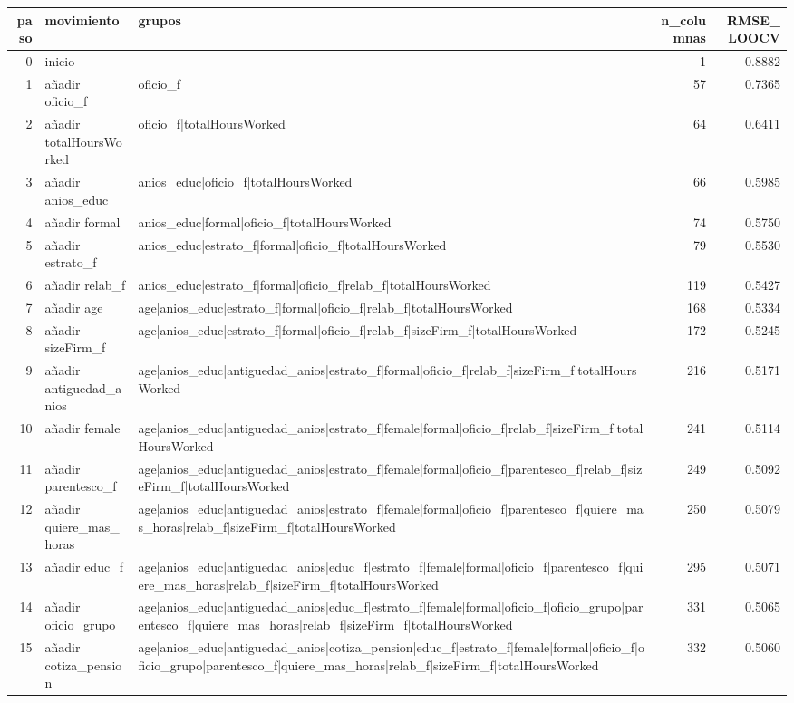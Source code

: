 \begin{tabular}{rllrr}
\toprule
paso & movimiento & grupos & n\_columnas & RMSE\_LOOCV \\
\midrule
0 & inicio &  & 1 & 0.8882 \\
1 & añadir oficio\_f & oficio\_f & 57 & 0.7365 \\
2 & añadir totalHoursWorked & oficio\_f|totalHoursWorked & 64 & 0.6411 \\
3 & añadir anios\_educ & anios\_educ|oficio\_f|totalHoursWorked & 66 & 0.5985 \\
4 & añadir formal & anios\_educ|formal|oficio\_f|totalHoursWorked & 74 & 0.5750 \\
5 & añadir estrato\_f & anios\_educ|estrato\_f|formal|oficio\_f|totalHoursWorked & 79 & 0.5530 \\
6 & añadir relab\_f & anios\_educ|estrato\_f|formal|oficio\_f|relab\_f|totalHoursWorked & 119 & 0.5427 \\
7 & añadir age & age|anios\_educ|estrato\_f|formal|oficio\_f|relab\_f|totalHoursWorked & 168 & 0.5334 \\
8 & añadir sizeFirm\_f & age|anios\_educ|estrato\_f|formal|oficio\_f|relab\_f|sizeFirm\_f|totalHoursWorked & 172 & 0.5245 \\
9 & añadir antiguedad\_anios & age|anios\_educ|antiguedad\_anios|estrato\_f|formal|oficio\_f|relab\_f|sizeFirm\_f|totalHoursWorked & 216 & 0.5171 \\
10 & añadir female & age|anios\_educ|antiguedad\_anios|estrato\_f|female|formal|oficio\_f|relab\_f|sizeFirm\_f|totalHoursWorked & 241 & 0.5114 \\
11 & añadir parentesco\_f & age|anios\_educ|antiguedad\_anios|estrato\_f|female|formal|oficio\_f|parentesco\_f|relab\_f|sizeFirm\_f|totalHoursWorked & 249 & 0.5092 \\
12 & añadir quiere\_mas\_horas & age|anios\_educ|antiguedad\_anios|estrato\_f|female|formal|oficio\_f|parentesco\_f|quiere\_mas\_horas|relab\_f|sizeFirm\_f|totalHoursWorked & 250 & 0.5079 \\
13 & añadir educ\_f & age|anios\_educ|antiguedad\_anios|educ\_f|estrato\_f|female|formal|oficio\_f|parentesco\_f|quiere\_mas\_horas|relab\_f|sizeFirm\_f|totalHoursWorked & 295 & 0.5071 \\
14 & añadir oficio\_grupo & age|anios\_educ|antiguedad\_anios|educ\_f|estrato\_f|female|formal|oficio\_f|oficio\_grupo|parentesco\_f|quiere\_mas\_horas|relab\_f|sizeFirm\_f|totalHoursWorked & 331 & 0.5065 \\
15 & añadir cotiza\_pension & age|anios\_educ|antiguedad\_anios|cotiza\_pension|educ\_f|estrato\_f|female|formal|oficio\_f|oficio\_grupo|parentesco\_f|quiere\_mas\_horas|relab\_f|sizeFirm\_f|totalHoursWorked & 332 & 0.5060 \\

\end{tabular}
